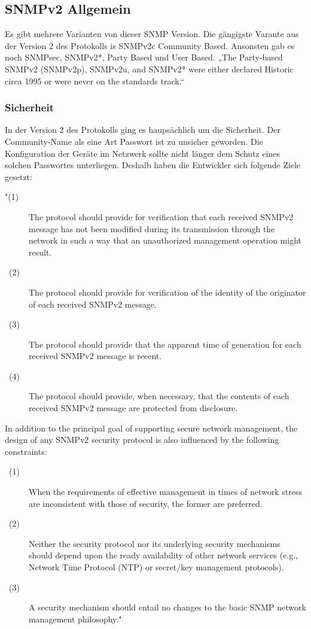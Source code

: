 \documentclass[11pt,a4paper]{article}
\begin{document}
\subsection{SNMPv2 Allgemein}
Es gibt mehrere Varianten von dieser SNMP Version. Die gängigste Varante aus der Version 2 des Protokolls is SNMPv2c Community Based. Ansonsten gab es noch SNMPsec, SNMPv2*, Party Based und User Based. „The Party-based SNMPv2 (SNMPv2p), SNMPv2u, and SNMPv2* were either declared Historic circa 1995 or were never on the standards track.“ \cite{rfcSnmpNotUsed}
\subsubsection{Sicherheit}
In der Version 2 des Protokolls ging es haupsächlich um die Sicherheit. Der Community-Name als eine Art Passwort ist zu unsicher geworden. Die Konfiguration der Geräte im Netzwerk sollte nicht länger dem Schutz eines solchen Passwortes unterliegen. Deshalb haben die Entwickler sich folgende Ziele gesetzt:
\begin{description}
	\item["(1)]
	The protocol should provide for verification that each received SNMPv2 message has not been modified during its transmission through the network 	in such a way that an unauthorized management operation might result.       
	\item[\ (2)]
	The protocol should provide for verification of the identity of the originator of each received SNMPv2 message.
	\item[\ (3)]
	The protocol should provide that the apparent time of generation for each received SNMPv2 message is recent.
	\item[\ (4)]
	The protocol should provide, when necessary, that the contents of each received SNMPv2 message are protected from disclosure.
\end{description}
In addition to the principal goal of supporting secure network management, the design of any SNMPv2 security protocol is also influenced by the following constraints:
\begin{description}
	\item[\ (1)]
	When the requirements of effective management in times of network stress are inconsistent with those of security, the former are preferred.
	\item[\ (2)]
	Neither the security protocol nor its underlying security mechanisms should depend upon the ready availability of other network services (e.g., 				Network Time Protocol (NTP) or secret/key management protocols).
	\item[\ (3)]
	A security mechanism should entail no changes to the basic SNMP network management philosophy."\ 
	\cite{rfcSnmpV2Securety}\\
\end{description}
\end{document}
